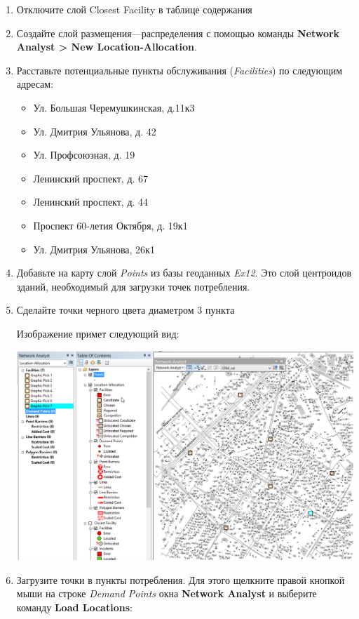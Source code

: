 \documentclass[]{book}
\theoremstyle{definition}
\theoremstyle{definition}
\theoremstyle{definition}
\theoremstyle{remark}
\begin{document}
\begin{enumerate}
\def\labelenumi{\arabic{enumi}.}
\item
  Отключите слой Closest Facility в таблице содержания
\item
  Создайте слой размещения---распределения с помощью команды
  \textbf{Network Analyst \textgreater{} New Location-Allocation}.
\item
  Расставьте потенциальные пункты обслуживания (\emph{Facilities}) по
  следующим адресам:

  \begin{itemize}
  \item
    Ул. Большая Черемушкинская, д.11к3
  \item
    Ул. Дмитрия Ульянова, д. 42
  \item
    Ул. Профсоюзная, д. 19
  \item
    Ленинский проспект, д. 67
  \item
    Ленинский проспект, д. 44
  \item
    Проспект 60-летия Октября, д. 19к1
  \item
    Ул. Дмитрия Ульянова, 26к1
  \end{itemize}
\item
  Добавьте на карту слой \emph{Points} из базы геоданных \emph{Ex12}.
  Это слой центроидов зданий, необходимый для загрузки точек
  потребления.
\item
  Сделайте точки черного цвета диаметром 3 пункта

  Изображение примет следующий вид:

  \includegraphics{images/Ex12/image21.png}
\item
  Загрузите точки в пункты потребления. Для этого щелкните правой
  кнопкой мыши на строке \emph{Demand Points} окна \textbf{Network
  Analyst} и выберите команду \textbf{Load Locations}:


\end{enumerate}
\end{document}
